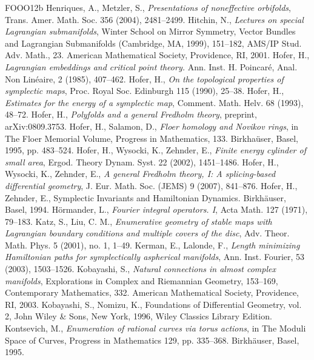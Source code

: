 \begin{thebibliography}{FOOO12b}
 Henriques, A., Metzler, S., \textit{Presentations of noneffective orbifolds}, Trans. Amer. Math. Soc. 356 (2004), 2481--2499.
 Hitchin, N., \textit{Lectures on special Lagrangian submanifolds}, Winter School on Mirror Symmetry, Vector Bundles and Lagrangian Submanifolds (Cambridge, MA, 1999), 151--182, AMS/IP Stud. Adv. Math., 23. American Mathematical Society, Providence, RI, 2001.
 Hofer, H., \textit{Lagrangian embeddings and critical point theory.} Ann. Inst. H. Poincaré, Anal. Non Linéaire, 2 (1985), 407--462.
 Hofer, H., \textit{On the topological properties of symplectic maps}, Proc. Royal Soc. Edinburgh 115 (1990), 25--38.
 Hofer, H., \textit{Estimates for the energy of a symplectic map}, Comment. Math. Helv. 68 (1993), 48--72.
 Hofer, H., \textit{Polyfolds and a general Fredholm theory}, preprint, arXiv:0809.3753.
 Hofer, H., Salamon, D., \textit{Floer homology and Novikov rings}, in The Floer Memorial Volume, Progress in Mathematics, 133. Birkhaüser, Basel, 1995, pp. 483--524.
 Hofer, H., Wysocki, K., Zehnder, E., \textit{Finite energy cylinder of small area}, Ergod. Theory Dynam. Syst. 22 (2002), 1451--1486.
 Hofer, H., Wysocki, K., Zehnder, E., \textit{A general Fredholm theory, I: A splicing-based differential geometry}, J. Eur. Math. Soc. (JEMS) 9 (2007), 841--876.
 Hofer, H., Zehnder, E., Symplectic Invariants and Hamiltonian Dynamics. Birkhäuser, Basel, 1994.
 Hörmander, L., \textit{Fourier integral operators. I}, Acta Math. 127 (1971), 79--183.
 Katz, S., Liu, C. M., \textit{Enumerative geometry of stable maps with Lagrangian boundary conditions and multiple covers of the disc}, Adv. Theor. Math. Phys. 5 (2001), no. 1, 1--49.
 Kerman, E., Lalonde, F., \textit{Length minimizing Hamiltonian paths for symplectically aspherical manifolds}, Ann. Inst. Fourier, 53 (2003), 1503--1526.
 Kobayashi, S., \textit{Natural connections in almost complex manifolds}, Explorations in Complex and Riemannian Geometry, 153--169, Contemporary Mathematics, 332. American Mathematical Society, Providence, RI, 2003.
 Kobayashi, S., Nomizu, K., Foundations of Differential Geometry, vol. 2, John Wiley \& Sons, New York, 1996, Wiley Classics Library Edition.
 Kontsevich, M., \textit{Enumeration of rational curves via torus actions}, in The Moduli Space of Curves, Progress in Mathematics 129, pp. 335--368. Birkhäuser, Basel, 1995.

\end{thebibliography}
